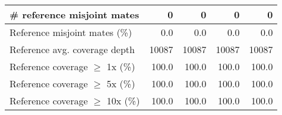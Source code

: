\documentclass[12pt,a4paper]{article}
\begin{document}
\begin{table}[ht]
\begin{center}
\begin{tabular}{|l*{4}{|r}|}
\# reference misjoint mates & 0 & 0 & 0 & 0 \\ \hline
Reference misjoint mates (\%) & 0.0 & 0.0 & 0.0 & 0.0 \\ \hline
Reference avg. coverage depth & 10087 & 10087 & 10087 & 10087 \\ \hline
Reference coverage $\geq$ 1x (\%) & 100.0 & 100.0 & 100.0 & 100.0 \\ \hline
Reference coverage $\geq$ 5x (\%) & 100.0 & 100.0 & 100.0 & 100.0 \\ \hline
Reference coverage $\geq$ 10x (\%) & 100.0 & 100.0 & 100.0 & 100.0 \\ \hline
\end{tabular}
\end{center}
\end{table}
\end{document}
